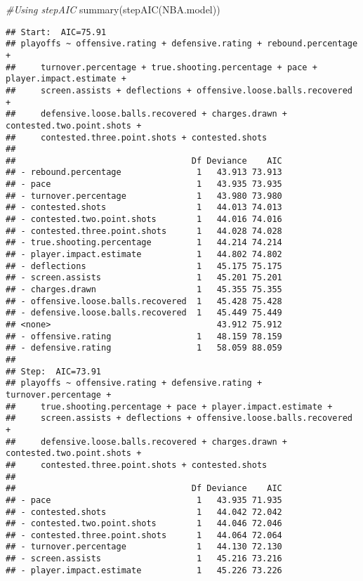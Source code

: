 \documentclass[
]{article}
\newenvironment{Shaded}{\begin{snugshade}}{\end{snugshade}}
\newcommand{\CommentTok}[1]{\textcolor[rgb]{0.56,0.35,0.01}{\textit{#1}}}
\newcommand{\FunctionTok}[1]{\textcolor[rgb]{0.00,0.00,0.00}{#1}}
\newcommand{\NormalTok}[1]{#1}
\begin{document}
\begin{Shaded}
\begin{Highlighting}[]
\CommentTok{\#Using stepAIC }
\FunctionTok{summary}\NormalTok{(}\FunctionTok{stepAIC}\NormalTok{(NBA.model))}
\end{Highlighting}
\end{Shaded}

\begin{verbatim}
## Start:  AIC=75.91
## playoffs ~ offensive.rating + defensive.rating + rebound.percentage + 
##     turnover.percentage + true.shooting.percentage + pace + player.impact.estimate + 
##     screen.assists + deflections + offensive.loose.balls.recovered + 
##     defensive.loose.balls.recovered + charges.drawn + contested.two.point.shots + 
##     contested.three.point.shots + contested.shots
## 
##                                   Df Deviance    AIC
## - rebound.percentage               1   43.913 73.913
## - pace                             1   43.935 73.935
## - turnover.percentage              1   43.980 73.980
## - contested.shots                  1   44.013 74.013
## - contested.two.point.shots        1   44.016 74.016
## - contested.three.point.shots      1   44.028 74.028
## - true.shooting.percentage         1   44.214 74.214
## - player.impact.estimate           1   44.802 74.802
## - deflections                      1   45.175 75.175
## - screen.assists                   1   45.201 75.201
## - charges.drawn                    1   45.355 75.355
## - offensive.loose.balls.recovered  1   45.428 75.428
## - defensive.loose.balls.recovered  1   45.449 75.449
## <none>                                 43.912 75.912
## - offensive.rating                 1   48.159 78.159
## - defensive.rating                 1   58.059 88.059
## 
## Step:  AIC=73.91
## playoffs ~ offensive.rating + defensive.rating + turnover.percentage + 
##     true.shooting.percentage + pace + player.impact.estimate + 
##     screen.assists + deflections + offensive.loose.balls.recovered + 
##     defensive.loose.balls.recovered + charges.drawn + contested.two.point.shots + 
##     contested.three.point.shots + contested.shots
## 
##                                   Df Deviance    AIC
## - pace                             1   43.935 71.935
## - contested.shots                  1   44.042 72.042
## - contested.two.point.shots        1   44.046 72.046
## - contested.three.point.shots      1   44.064 72.064
## - turnover.percentage              1   44.130 72.130
## - screen.assists                   1   45.216 73.216
## - player.impact.estimate           1   45.226 73.226

\end{verbatim}
\end{document}
